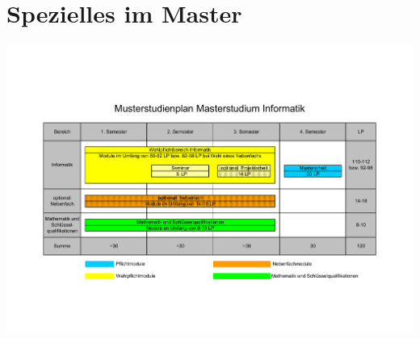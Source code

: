 
\newpage
\section{Spezielles im Master}
	\label{master}
	
\begin{minipage}{1.0\linewidth}
	\begin{center}     
 		\includegraphics[width=\textwidth,totalheight=0.5\textheight ]{bilder/studienplan_msc/Musterstudienplan_MSc.pdf}
	\end{center} 
\end{minipage}

